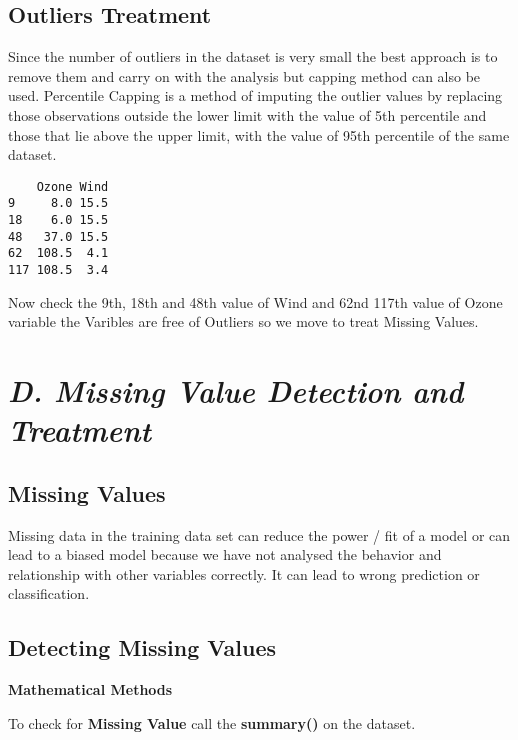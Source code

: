 \documentclass[12pt,]{article}
\begin{document}
\subsection{\texorpdfstring{\textbf{Outliers
Treatment}}{Outliers Treatment}}\label{outliers-treatment}

Since the number of outliers in the dataset is very small the best
approach is to remove them and carry on with the analysis but capping
method can also be used. Percentile Capping is a method of imputing the
outlier values by replacing those observations outside the lower limit
with the value of 5th percentile and those that lie above the upper
limit, with the value of 95th percentile of the same dataset.

\begin{verbatim}
    Ozone Wind
9     8.0 15.5
18    6.0 15.5
48   37.0 15.5
62  108.5  4.1
117 108.5  3.4
\end{verbatim}

Now check the 9th, 18th and 48th value of Wind and 62nd 117th value of
Ozone variable the Varibles are free of Outliers so we move to treat
Missing Values.

\section{\texorpdfstring{\emph{D. Missing Value Detection and
Treatment}}{D. Missing Value Detection and Treatment}}\label{d.-missing-value-detection-and-treatment}

\subsection{\texorpdfstring{\textbf{Missing
Values}}{Missing Values}}\label{missing-values}

Missing data in the training data set can reduce the power / fit of a
model or can lead to a biased model because we have not analysed the
behavior and relationship with other variables correctly. It can lead to
wrong prediction or classification.

\subsection{\texorpdfstring{\textbf{Detecting Missing
Values}}{Detecting Missing Values}}\label{detecting-missing-values}

\textbf{Mathematical Methods}

To check for \textbf{Missing Value} call the \textbf{summary()} on the
dataset.
\end{document}
